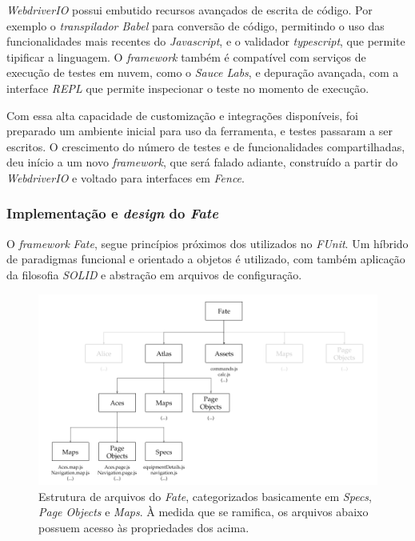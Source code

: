 \emph{WebdriverIO} possui embutido recursos avançados de escrita de código. Por exemplo o \emph{transpilador Babel} para conversão de código, permitindo o uso das funcionalidades mais recentes do \emph{Javascript}, e o validador \emph{typescript}, que permite tipificar a linguagem. O \emph{framework} também é compatível com serviços de execução de testes em nuvem, como o \emph{Sauce Labs}, e depuração avançada, com a interface \emph{REPL} que permite inspecionar o teste no momento de execução.

Com essa alta capacidade de customização e integrações disponíveis, foi preparado um ambiente inicial para uso da ferramenta, e testes passaram a ser escritos. O crescimento do número de testes e de funcionalidades compartilhadas, deu início a um novo \emph{framework}, que será falado adiante, construído a partir do \emph{WebdriverIO} e voltado para interfaces em \emph{Fence}.

\hypertarget{implementacao-e-design-do-fate}{%
\subsubsection{\texorpdfstring{Implementação e \emph{design} do \emph{Fate}}{Implementação e design do Fate}}\label{implementacao-e-design-do-fate}}

O \emph{framework} \emph{Fate}, segue princípios próximos dos utilizados no \emph{FUnit}. Um híbrido de paradigmas funcional e orientado a objetos é utilizado, com também aplicação da filosofia \emph{SOLID} e abstração em arquivos de configuração.

\begin{figure}[H]
    \centering
    \includegraphics[width=15cm]{source/4-solucao/images/fate-esq-2.png}
    \caption{Estrutura de arquivos do \emph{Fate}, categorizados basicamente em \emph{Specs}, \emph{Page Objects} e \emph{Maps}. À medida que se ramifica, os arquivos abaixo possuem acesso às propriedades dos acima.}
    \label{fig:fate-esq-2}
\end{figure}

